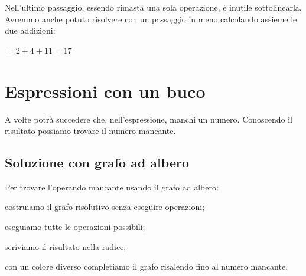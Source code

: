 Nell'ultimo passaggio, essendo rimasta una sola operazione, è inutile 
sottolinearla. Avremmo anche potuto risolvere con un passaggio in meno
calcolando assieme le due addizioni:

\(= 2 + 4 + 11 = 17\)

\section{Espressioni con un buco}
\label{sec:01_espressioni_buco}

A volte potrà succedere che, nell'espressione, manchi un numero.
Conoscendo il risultato possiamo trovare il numero mancante.

\subsection{Soluzione con grafo ad albero}

\begin{procedura}
 Per trovare l'operando mancante usando il grafo ad albero:
\begin{enumerate*}
 \item costruiamo il grafo risolutivo senza eseguire operazioni;
 \item eseguiamo tutte le operazioni possibili;
 \item scriviamo il risultato nella radice;
 \item con un colore diverso completiamo il grafo risalendo fino al numero 
  mancante.
\end{enumerate*}
\end{procedura}

